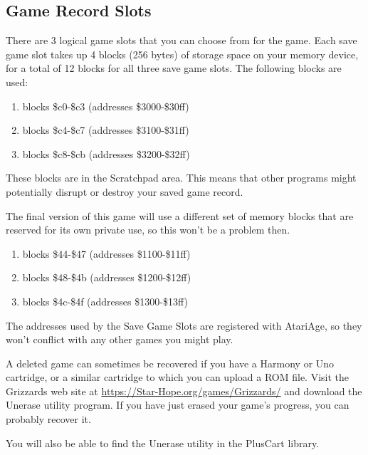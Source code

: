 \documentclass[10pt,twocolumn,openany,article]{memoir}
\begin{document}
\begin{description}
\else

\section{Game Record Slots}

There are 3  logical game slots that  you can choose from  for the game.
Each save game  slot takes up 4  blocks (256 bytes) of  storage space on
your memory  device, for a  total of 12 blocks  for all three  save game
slots. The following blocks are used:

\ifdefined\DEMO

\begin{enumerate}
\item blocks \$c0-\$c3 (addresses \$3000-\$30ff)
\item blocks \$c4-\$c7 (addresses \$3100-\$31ff)
\item blocks \$c8-\$cb (addresses \$3200-\$32ff)
\end{enumerate}

These blocks are in the Scratchpad  area. This means that other programs
might potentially disrupt or destroy your saved game record.

The final version of this game will use a different set of memory blocks
that  are  reserved   for  its  own  private  use,  so   this  won't  be
a problem then.

\else

\begin{enumerate}
\item blocks \$44-\$47 (addresses \$1100-\$11ff)
\item blocks \$48-\$4b (addresses \$1200-\$12ff)
\item blocks \$4c-\$4f (addresses \$1300-\$13ff)
\end{enumerate}

The addresses used by the Save  Game Slots are registered with AtariAge,
so they won't conflict with any other games you might play.

A deleted game can  sometimes be recovered if you have  a Harmony or Uno
cartridge, or  a similar cartridge to  which you can upload  a ROM file.
Visit the Grizzards web site at
\href{https://Star-Hope.org/games/Grizzards/}{https://Star-Hope\-.org/\-games/\-Grizzards/}
and download the  Unerase utility program. If you have  just erased your
game's progress, you can probably recover it.

You will also be able to find the Unerase utility in the PlusCart library.


\end{description}
\end{document}
